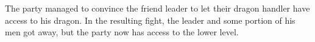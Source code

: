 The party managed to convince the friend leader to let their dragon handler have access to his dragon.
In the resulting fight, the leader and some portion of his men got away, but the party now has access to the lower level.
